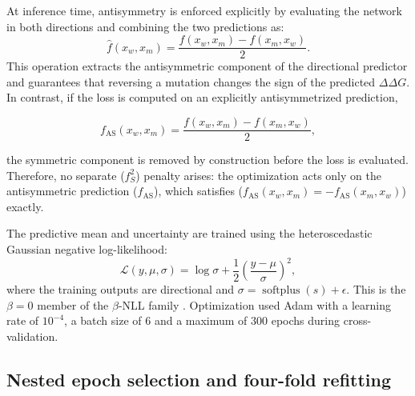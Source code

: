 \documentclass[11pt]{article}
\begin{document}
At inference time, antisymmetry is enforced explicitly by evaluating the network in both directions and combining the two predictions as:
\begin{equation}
    \hat{f}(x_w,x_m) =
    \frac{f(x_w,x_m)-f(x_m,x_w)}{2}.
\end{equation}
This operation extracts the antisymmetric component of the directional predictor and guarantees that reversing a mutation changes the sign of the predicted $\Delta\Delta G$.
In contrast, if the loss is computed on an explicitly antisymmetrized prediction,

\begin{equation}
f_{\mathrm{AS}}(x_w,x_m)=\frac{f(x_w,x_m)-f(x_m,x_w)}{2},    
\end{equation}

the symmetric component is removed by construction before the loss is evaluated. Therefore, no separate ($f_S^2$) penalty arises: the optimization acts only on the antisymmetric prediction ($f_{\mathrm{AS}}$), which satisfies ($f_{\mathrm{AS}}(x_w,x_m)=-f_{\mathrm{AS}}(x_m,x_w)$) exactly.


The predictive mean and uncertainty are trained using the heteroscedastic Gaussian negative log-likelihood:
\begin{equation}
    \mathcal{L}(y,\mu,\sigma) =
    \log\sigma+
    \frac{1}{2}\left(\frac{y-\mu}{\sigma}\right)^2,
\end{equation}
where the training outputs are directional and $\sigma=\operatorname{softplus}(s)+\epsilon$. This is the $\beta=0$ member of the $\beta$-NLL family \citep{seitzer2022pitfalls}. Optimization used Adam with a learning rate of $10^{-4}$, a batch size of 6 and a maximum of 300 epochs during cross-validation.

\subsection{Nested epoch selection and four-fold refitting}
\end{document}
